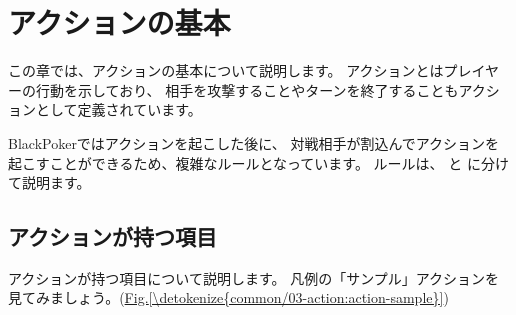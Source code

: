 \documentclass[letterpaper,10pt,dvipdfmx]{sphinxmanual}
\begin{document}
\section{アクションの基本}
\label{\detokenize{common/03-action:id1}}\label{\detokenize{common/03-action::doc}}
この章では、アクションの基本について説明します。
アクションとはプレイヤーの行動を示しており、
相手を攻撃することやターンを終了することもアクションとして定義されています。

BlackPokerではアクションを起こした後に、
対戦相手が割込んでアクションを起こすことができるため、複雑なルールとなっています。
ルールは、 {\hyperref[\detokenize{common/03-action::doc}]{}} と {\hyperref[\detokenize{common/05-action_detail::doc}]{}} に分けて説明ます。


\subsection{アクションが持つ項目}
\label{\detokenize{common/03-action:id2}}
アクションが持つ項目について説明します。
凡例の「サンプル」アクションを見てみましょう。(\hyperref[\detokenize{common/03-action:action-sample}]{Fig.\@ \ref{\detokenize{common/03-action:action-sample}}})
\end{document}
